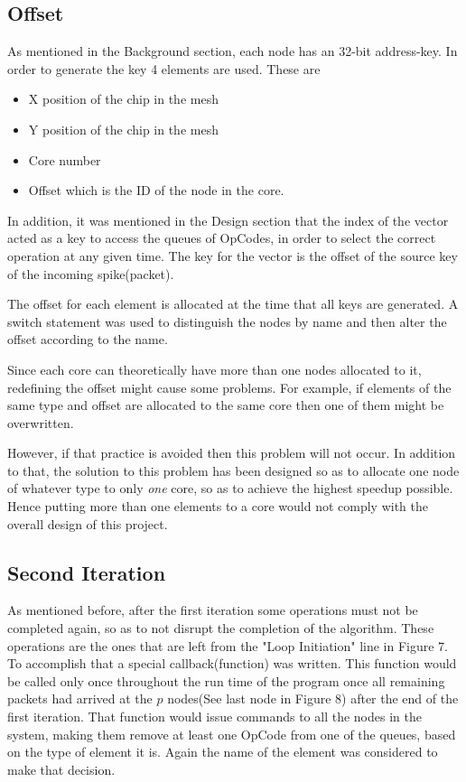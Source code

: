 \documentclass[12pt,a4paper]{article}
\begin{document}
\subsection{Offset}
As mentioned in the Background section, each node has an 32-bit address-key. In order to generate the key 4 elements are used. These are
\begin{itemize}
\item X position of the chip in the mesh
\item Y position of the chip in the mesh
\item Core number
\item Offset which is the ID of the node in the core.
\end{itemize}
In addition, it was mentioned in the Design section that the index of the vector acted as a key to access the queues of OpCodes, in order to select the correct operation at any given time. The key for the vector is the offset of the source key of the incoming spike(packet).

The offset for each element is allocated at the time that all keys are generated. A switch statement was used to distinguish the nodes by name and then alter the offset according to the name. 

Since each core can theoretically have more than one nodes allocated to it, redefining the offset might cause some problems. For example, if elements of the same type and offset are allocated to the same core then one of them might be overwritten. 

However, if that practice is avoided then this problem will not occur. In addition to that, the solution to this problem has been designed so as to allocate one node of whatever type to only \emph{one} core, so as to achieve the highest speedup possible. Hence putting more than one elements to a core would not comply with the overall design of this project.
\subsection{Second Iteration}
As mentioned before, after the first iteration some operations must not be completed again, so as to not disrupt the completion of the algorithm. These operations are the ones that are left from the "Loop Initiation" line in Figure 7. To accomplish that a special callback(function) was written. This function would be called only once throughout the run time of the program once all remaining packets had arrived at the $p$ nodes(See last node in Figure 8) after the end of the first iteration. That function would issue commands to all the nodes in the system, making them remove at least one OpCode from one of the queues, based on the type of element it is. Again the name of the element was considered to make that decision.
\end{document}
